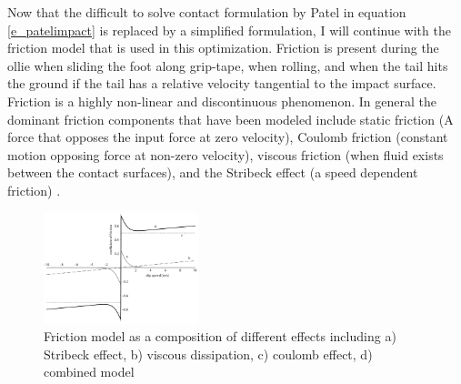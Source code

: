 Now that the difficult to solve contact formulation by Patel in equation \ref{e_patelimpact} is replaced by a simplified formulation, I will continue with the friction model that is used in this optimization.
Friction is present during the ollie when sliding the foot along grip-tape, when rolling, and when the tail hits the ground if the tail has a relative velocity tangential to the impact surface. Friction is a highly non-linear and discontinuous phenomenon. In general the dominant friction components that have been modeled include static friction (A force that opposes the input force at zero velocity), Coulomb friction (constant motion opposing force at non-zero velocity), viscous friction (when fluid exists between the contact surfaces), and the Stribeck effect (a speed dependent friction) \cite{makkar_new_2005}. 
\begin{figure}
    \centering
    \includegraphics[width=0.4\textwidth]{figure/friction_.png}
    \caption[Friction effects]{Friction model as a composition of different effects including a) Stribeck effect, b) viscous dissipation, c) coulomb effect, d) combined model}
    \label{f_friction}
\end{figure}

